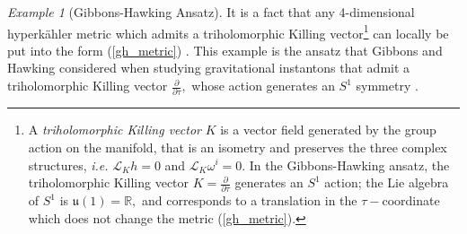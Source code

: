 \documentclass[a4paper,12pt, onecolumn, notitlepage]{article}
\theoremstyle{definition}
\theoremstyle{remark}
\newtheorem{ex}[thm]{Example}
\newcommand{\ie}{\emph{i.e.} }
\newcommand{\w}{\omega}
\newcommand{\ddt}[1]{\frac{\partial #1}{\partial \tau}}
\newcommand{\HK}{hyperk\"ahler }
\begin{document}
\begin{ex}[Gibbons-Hawking Ansatz]
	It is a fact that any 4-dimensional \HK metric which admits a triholomorphic Killing vector\footnote{A \emph{triholomorphic Killing vector} $K$ is a vector field generated by the group action on the manifold, that is an isometry and preserves the three complex structures, \ie $\mathcal{L}_{K}h=0$ and $\mathcal{L}_{K}\w^{i}=0.$ In the Gibbons-Hawking ansatz, the triholomorphic Killing vector $K=\ddt{}$ generates an $S^{1}$ action; the Lie algebra of $S^{1}$ is $\mathfrak{u}(1)=\mathbb{R},$ and corresponds to a translation in the $\tau-$coordinate which does not change the metric (\ref{gh_metric}).} can locally be put into the form (\ref{gh_metric}) \cite{solitons}. This example is the ansatz that Gibbons and Hawking considered when studying gravitational instantons that admit a triholomorphic Killing vector $\ddt{},$ whose action generates an $S^{1}$ symmetry \cite{gibbons_1978}.\\
\end{ex}
\end{document}
